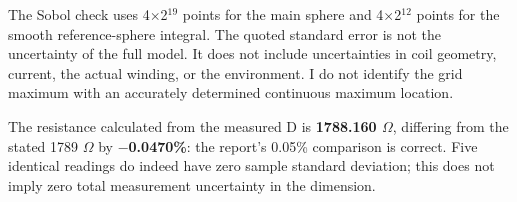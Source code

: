 \documentclass[10pt,a4paper]{article}
\begin{document}
{\begin{center}\vspace{-2pt}\end{center}
\par
The Sobol check uses 4$\times$2$^{19}$ points for the main sphere and 4$\times$2$^{12}$ points for the smooth reference-sphere integral. The quoted standard error is not the uncertainty of the full model. It does not include uncertainties in coil geometry, current, the actual winding, or the environment. I do not identify the grid maximum with an accurately determined continuous maximum location.
\par
The resistance calculated from the measured D is \textbf{1788.160 $\Omega$}, differing from the stated 1789 $\Omega$ by \textbf{$-$0.0470\%}: the report's 0.05\% comparison is correct. Five identical readings do indeed have zero sample standard deviation; this does not imply zero total measurement uncertainty in the dimension.
\par
\vspace{2pt}\par\vspace{0.5pt}
}
\end{document}
